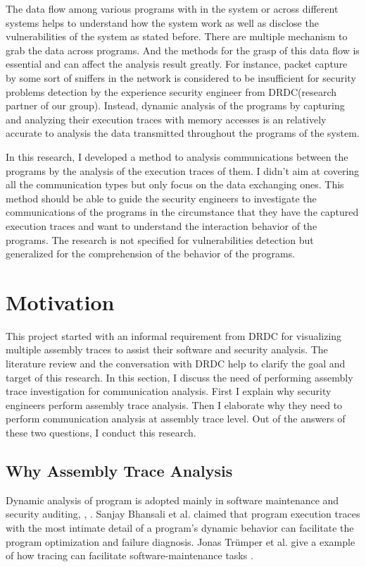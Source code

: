 The data flow among various programs with in the system or across different systems helps to understand how the system work as well as disclose the vulnerabilities of the system as stated before. There are multiple mechanism to grab the data across programs. And the methods for the grasp of this data flow is essential and can affect the analysis result greatly. For instance, packet capture by some sort of sniffers in the network is considered to be insufficient for security problems detection by the experience security engineer from DRDC(research partner of our group). Instead, dynamic analysis of the programs by capturing and analyzing their execution traces with memory accesses is an relatively accurate to analysis the data transmitted throughout the programs of the system. 

In this research, I developed a method to analysis communications between the programs by the analysis of the execution traces of them. I didn't aim at covering all the communication types but only focus on the data exchanging ones. This method should be able to guide the security engineers to investigate the communications of the programs in the circumstance that they have the captured execution traces and want to understand the interaction behavior of the programs. The research is not specified for vulnerabilities detection but generalized for the comprehension of the behavior of the programs.

\section{Motivation}
This project started with an informal requirement from DRDC for visualizing multiple assembly traces to assist their software and security analysis. The literature review and the conversation with DRDC help to clarify the goal and target of this research. In this section, I discuss the need of performing assembly trace investigation for communication analysis. First I explain why security engineers perform assembly trace analysis. Then I elaborate why they need to perform communication analysis at assembly trace level. Out of the answers of these two questions, I conduct this research.

\subsection{Why Assembly Trace Analysis}
Dynamic analysis of program is adopted mainly in software maintenance and security auditing\cite{zhang2010detecting}, \cite{cai2016sworddta}, \cite{somorovsky2016systematic}. Sanjay Bhansali et al. claimed that program execution traces with the most intimate detail of a program's dynamic behavior can facilitate the program optimization and failure diagnosis. Jonas Tr{\"u}mper et al. give a example of how tracing can facilitate software-maintenance tasks \cite{trumper2012maintenance}.

